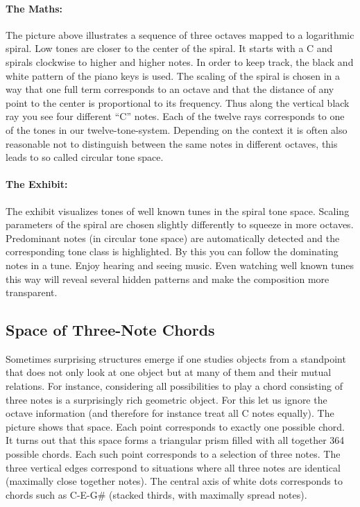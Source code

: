 \paragraph{The Maths:} The picture above illustrates a sequence of three octaves mapped to a logarithmic spiral. Low tones are closer to the center of the spiral. It starts with a C and spirals clockwise to higher and higher notes. In order to keep track, the black and white pattern of the piano keys is used. The scaling of the spiral is chosen in a way that one full term corresponds to an octave and that the distance of any point to the center is proportional to its frequency. Thus along the vertical black ray you see four different ``C'' notes. Each of the twelve rays corresponds to one of the tones in our twelve-tone-system. Depending on the context it is often also reasonable not to distinguish between the same notes in different octaves, this leads to so called circular tone space.

\paragraph{The Exhibit:} The exhibit visualizes tones of well known tunes in the spiral tone space. Scaling parameters of the spiral are chosen slightly differently to squeeze in more octaves. Predominant notes (in circular tone space) are automatically detected and the corresponding tone class is highlighted. By this you can follow the dominating notes in a tune. Enjoy hearing and seeing music. Even watching well known tunes this way will reveal several hidden patterns and make the composition more transparent.

\subsection{Space of Three-Note Chords}
Sometimes surprising structures emerge if one studies objects from a standpoint that does not only look at one object but at many of them and their mutual relations. For instance, considering all possibilities to play a chord consisting of three notes is a surprisingly rich geometric object. For this let us ignore the octave information (and therefore for instance treat all C notes equally). The picture shows that space. Each point corresponds to exactly one possible chord. It turns out that this space forms a triangular prism filled with all together 364 possible chords. Each such point corresponds to a selection of three notes. The three vertical edges correspond to situations where all three notes are identical (maximally close together notes). The central axis of white dots corresponds to chords such as C-E-G\# (stacked thirds, with maximally spread notes).

